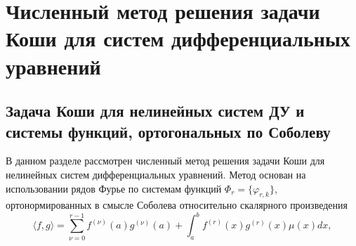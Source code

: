 \chapter{Численный метод решения задачи Коши для систем дифференциальных уравнений}\label{odes-sob-ode-ch}



\section{Задача Коши для нелинейных систем ДУ и системы функций, ортогональных по Соболеву}

В данном разделе рассмотрен численный метод решения задачи Коши для нелинейных систем дифференциальных уравнений. Метод основан на использовании рядов Фурье по системам функций $\Phi_r=\{\varphi_{r,k}\}$, ортонормированных в смысле Соболева относительно скалярного произведения
\begin{equation}\label{odes-inner-prod}
\langle f,g \rangle =
\sum_{\nu=0}^{r-1}f^{(\nu)}(a)g^{(\nu)}(a)+\int_{a}^{b}f^{(r)}(x)g^{(r)}(x)\mu(x)dx,
\end{equation}

